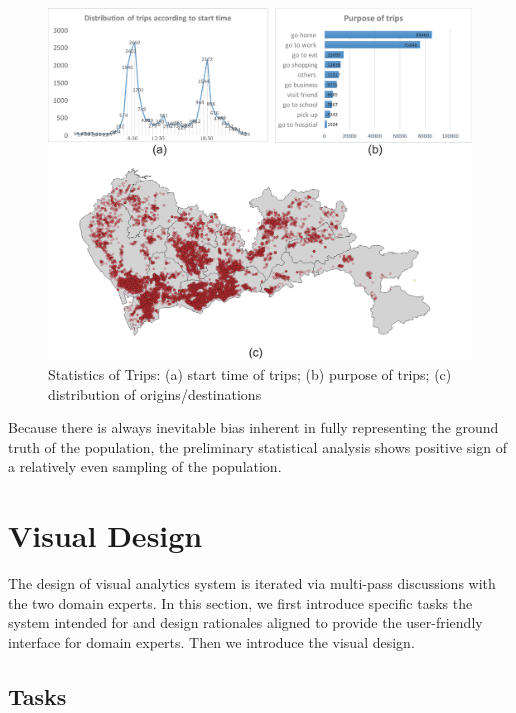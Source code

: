 \documentclass{ieeeaccess}
\begin{document}
\begin{figure}[htb!]
 \centering %
 \includegraphics[width=\columnwidth]{pictures/data3}
 \caption{Statistics of Trips: (a) start time of trips; (b) purpose of trips; (c) distribution of origins/destinations }
 \label{fig:data_geometry}
\end{figure}

Because there is always inevitable bias inherent in fully representing the ground truth of the population, the preliminary statistical analysis shows positive sign of a relatively even sampling of the population.

\section{Visual Design}

The design of visual analytics system is iterated via multi-pass discussions with the two domain experts. In this section, we first introduce specific tasks the system intended for and design rationales aligned to provide the user-friendly interface for domain experts. Then we introduce the visual design.

\subsection{Tasks}
\end{document}
